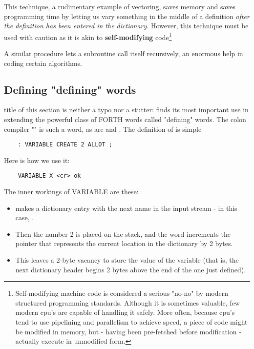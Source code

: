 This technique, a rudimentary example of vectoring, saves memory and saves programming time by letting us vary something in the middle of a definition \textit{after the definition has been entered in the dictionary}. However, this technique must be used with caution as it is akin to \textbf{self-modifying} code\footnote{Self-modifying machine code is considered a serious "no-no" by modern structured programming standards. Although it is sometimes valuable, few modern cpu's are capable of handling it safely. More often, because cpu's tend to use pipelining and parallelism to achieve speed, a piece of code might be modified in memory, but - having been pre-fetched before modification - actually execute in unmodified form.}

A similar procedure lets a subroutine call itself recursively, an enormous help in coding certain algorithms.

\subsection{Defining "defining" words}

 title of this section is neither a typo nor a stutter:  finds its most important use in extending the powerful class of FORTH words called "defining" words. The colon compiler "\bc{:}" is such a word, as are  and . The definition of  is simple

\begin{lstlisting}
    : VARIABLE CREATE 2 ALLOT ;
\end{lstlisting}

Here is how we use it:
\begin{lstlisting}
    VARIABLE X <cr> ok
\end{lstlisting}

The inner workings of VARIABLE are these:
\begin{itemize}
    \item {} makes a dictionary entry with the next name in the input stream - in this case, .
    \item Then the number 2 is placed on the stack, and the word  increments the pointer that represents the current location in the dictionary by 2 bytes.
    \item This leaves a 2-byte vacancy to store the value of the variable (that is, the next dictionary header begins 2 bytes above the end of the one just defined).
\end{itemize}

